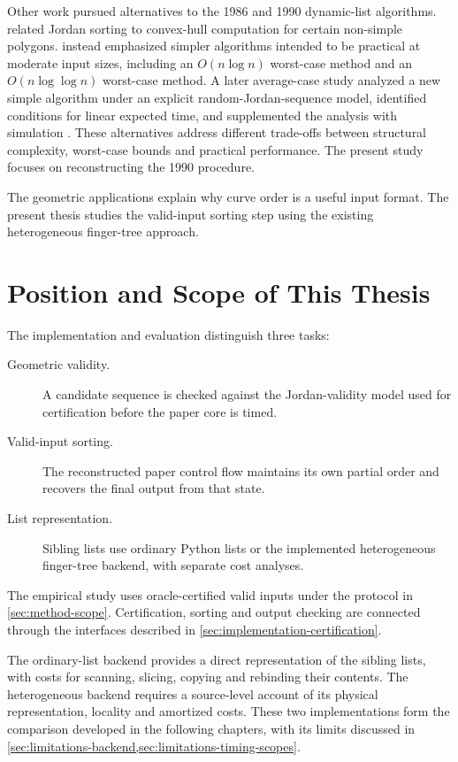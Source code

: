 Other work pursued alternatives to the 1986 and 1990 dynamic-list algorithms.
\Textcite{aurenhammer1987convex} related Jordan sorting to convex-hull
computation for certain non-simple polygons. \Textcite{sojka1997simple}
instead emphasized simpler algorithms intended to be practical at moderate
input sizes, including an $O(n\log n)$ worst-case method and an
$O(n\log\log n)$ worst-case method. A later average-case study analyzed a new
simple algorithm under an explicit random-Jordan-sequence model, identified
conditions for linear expected time, and supplemented the analysis with
simulation \parencite{sojka1999average}. These alternatives address different
trade-offs between structural complexity, worst-case bounds and practical
performance. The present study focuses on reconstructing the 1990 procedure.

The geometric applications explain why curve order is a useful input format.
The present thesis studies the valid-input sorting step using the existing
heterogeneous finger-tree approach.

\section{Position and Scope of This Thesis}
\label{sec:background-thesis-scope}

The implementation and evaluation distinguish three tasks:
\begin{description}
  \item[Geometric validity.] A candidate sequence is checked against the
    Jordan-validity model used for certification before the paper core is timed.
  \item[Valid-input sorting.] The reconstructed paper control flow maintains
    its own partial order and recovers the final output from that state.
  \item[List representation.] Sibling lists use ordinary Python lists or the
    implemented heterogeneous finger-tree backend, with separate cost analyses.
\end{description}

The empirical study uses oracle-certified valid inputs under the protocol in
\cref{sec:method-scope}. Certification, sorting and output checking are
connected through the interfaces described in
\cref{sec:implementation-certification}.

The ordinary-list backend provides a direct representation of the sibling
lists, with costs for scanning, slicing, copying and rebinding their contents.
The heterogeneous backend requires a source-level account of its physical
representation, locality and amortized costs. These two implementations form
the comparison developed in the following chapters, with its limits discussed in
\cref{sec:limitations-backend,sec:limitations-timing-scopes}.
